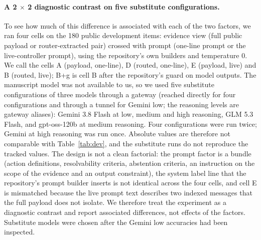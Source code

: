 \paragraph{A 2 $\times$ 2 diagnostic contrast on five substitute configurations.} To see how much of this difference is associated with each of the two factors, we ran four cells on the 180 public development items: evidence view (full public payload or router-extracted pair) crossed with prompt (one-line prompt or the live-controller prompt), using the repository's own builders and temperature 0. We call the cells A (payload, one-line), D (routed, one-line), E (payload, live) and B (routed, live); B+g is cell B after the repository's guard on model \abstain{} outputs. The manuscript model was not available to us, so we used five substitute configurations of three models through a gateway (reached directly for four configurations and through a tunnel for Gemini low; the reasoning levels are gateway aliases): Gemini 3.8 Flash at low, medium and high reasoning, GLM 5.3 Flash, and gpt-oss-120b at medium reasoning. Four configurations were run twice; Gemini at high reasoning was run once. Absolute values are therefore not comparable with Table~\ref{tab:dev}, and the substitute runs do not reproduce the tracked values. The design is not a clean factorial: the prompt factor is a bundle (action definitions, resolvability criteria, abstention criteria, an instruction on the scope of the evidence and an output constraint), the system label line that the repository's prompt builder inserts is not identical across the four cells, and cell E is mismatched because the live prompt text describes two indexed messages that the full payload does not isolate. We therefore treat the experiment as a diagnostic contrast and report associated differences, not effects of the factors. Substitute models were chosen after the Gemini low accuracies had been inspected.

